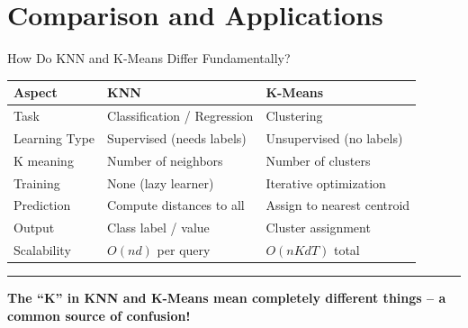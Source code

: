 \documentclass[8pt,aspectratio=169]{beamer}
\newcommand{\bottomnote}[1]{%
\vfill
\vspace{-2mm}
\textcolor{mllavender2}{\rule{\textwidth}{0.4pt}}
\vspace{1mm}
\footnotesize
\textbf{#1}
}
\begin{document}
\section{Comparison and Applications}

\begin{frame}[t]{How Do KNN and K-Means Differ Fundamentally?}
\begin{center}
\begin{tabular}{lll}
\toprule
\textbf{Aspect} & \textbf{KNN} & \textbf{K-Means} \\
\midrule
Task & Classification / Regression & Clustering \\
Learning Type & Supervised (needs labels) & Unsupervised (no labels) \\
K meaning & Number of neighbors & Number of clusters \\
Training & None (lazy learner) & Iterative optimization \\
Prediction & Compute distances to all & Assign to nearest centroid \\
Output & Class label / value & Cluster assignment \\
Scalability & $O(nd)$ per query & $O(nKdT)$ total \\
\bottomrule
\end{tabular}
\end{center}
\bottomnote{The ``K'' in KNN and K-Means mean completely different things -- a common source of confusion!}
\end{frame}
\end{document}
